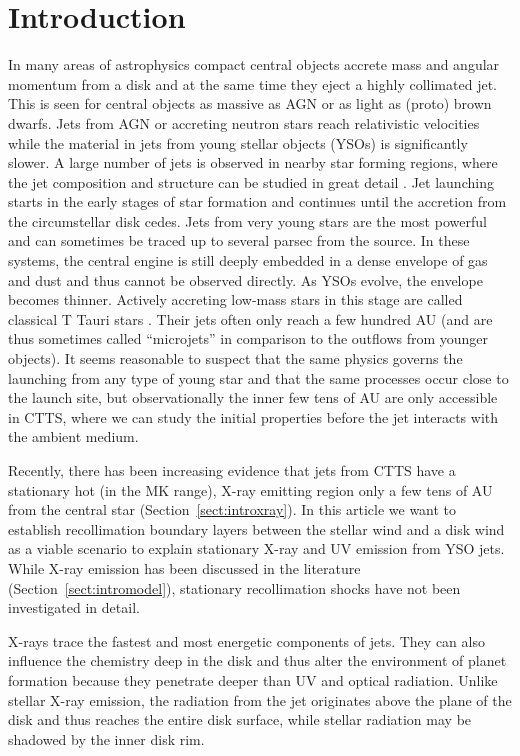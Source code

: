 \section{Introduction} 
In many areas of astrophysics compact central objects accrete mass and angular momentum from a disk and at the same time they eject a highly collimated jet. This is seen for central objects as massive as AGN or as light as (proto) brown dwarfs. Jets from AGN or accreting neutron stars reach relativistic velocities while the material in jets from young stellar objects (YSOs) is significantly slower. 
A large number of jets is observed in nearby star forming regions, where the jet composition and structure can be studied in great detail \citep[see the review by][]{2014arXiv1402.3553F}.
Jet launching starts in the early stages of star formation and continues until the accretion from the circumstellar disk cedes. Jets from very young stars are the most powerful and can sometimes be traced up to several parsec from the source. In these systems, the central engine is still deeply embedded in a dense envelope of gas and dust and thus cannot be observed directly. As YSOs evolve, the envelope becomes thinner. Actively accreting low-mass stars in this stage are called classical T Tauri stars \citep[for a review see][]{2013AN....334...67G}. Their jets often only reach a few hundred AU (and are thus sometimes called ``microjets'' in comparison to the outflows from younger objects).
It seems reasonable to suspect that the same physics governs the launching from any type of young star and that the same processes occur close to the launch site, but observationally the inner few tens of AU are only accessible in CTTS, where we can study the initial properties before the jet interacts with the ambient medium. 

Recently, there has been increasing evidence that jets from CTTS have a stationary hot (in the MK range), X-ray emitting region only a few tens of AU from the central star (Section~\ref{sect:introxray}). In this article we want to establish recollimation boundary layers between the stellar wind and a disk wind as a viable scenario to explain stationary X-ray and UV emission from YSO jets.
While X-ray emission has been discussed in the literature (Section~\ref{sect:intromodel}), stationary recollimation shocks have not been investigated in detail. 

X-rays trace the fastest and most energetic components of jets. They can also influence the chemistry deep in the disk \citep[e.g.][]{2010ApJ...714.1511H,2012ApJ...756..157G} and thus alter the environment of planet formation because they penetrate deeper than UV and optical radiation. Unlike stellar X-ray emission, the radiation from the jet originates above the plane of the disk and thus reaches the entire disk surface, while stellar radiation may be shadowed by the inner disk rim.

